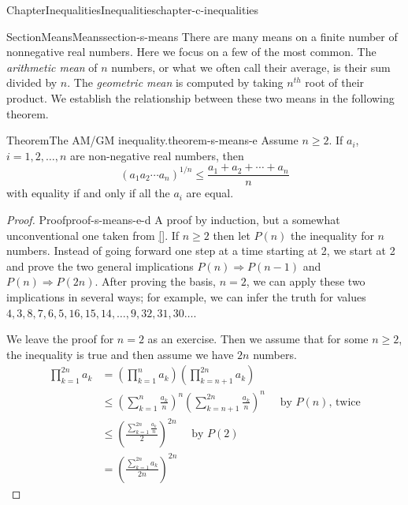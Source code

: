 \documentclass[oneside,10pt,]{book}
\newcommand{\xreffont}{\relax}
\numberwithin{equation}{section}
\begin{document}
\begin{chapterptx}{Chapter}{Inequalities}{}{Inequalities}{}{}{chapter-c-inequalities}
\typeout{************************************************}
%
\begin{sectionptx}{Section}{Means}{}{Means}{}{}{section-s-means}
%
%
There are many means on a finite number of nonnegative real numbers.  Here we focus on a few of the most common.  The \emph{arithmetic mean} of \(n\) numbers, or what we often call their average, is their sum divided by \(n\).  The \emph{geometric mean} is computed by taking \(n^{th}\) root of their product.  We establish the relationship between these two means in the following theorem.%
\begin{theorem}{Theorem}{The AM\slash{}GM inequality.}{}{theorem-s-means-e}%
%
Assume \(n \geq 2\).  If \(a_i\), \(i = 1, 2, \dots, n\) are non-negative real numbers, then%
\begin{equation*}
\left(a_1 a_2\cdots  a_n\right)^{1/n}\leq  \frac{a_1+a_2+\cdots +a_n}{n}
\end{equation*}
with equality if and only if all the \(a_i\) are equal.%
\end{theorem}
\begin{proof}{Proof}{}{proof-s-means-e-d}
A proof by induction, but a somewhat unconventional one taken from \hyperlink{biblio-biblio-aigner}{[{\xreffont 1}]}. If \(n \ge 2\) then let \(P(n)\) the inequality for \(n\) numbers.  Instead of going forward one step at a time starting at 2, we start at 2 and prove the two general implications  \(P(n)\Rightarrow P(n-1)\)  and \(P(n)\Rightarrow P(2n)\).  After proving the basis, \(n=2\), we can apply these two implications in several ways; for example, we can infer the truth for values \(4, 3, 8, 7, 6, 5, 16, 15, 14, \dots, 9, 32, 31, 30 \dots\).%
\par
We leave the proof for \(n=2\) as an exercise.  Then we assume that for some \(n \geq 2\), the inequality is true and then assume we have \(2n\) numbers.%
\begin{equation*}
\begin{split}
\prod_{k=1}^{2n} a_k &=\left(\prod_{k=1}^{n} a_k \right)\left(\prod_{k=n+1}^{2n} a_k  \right) \\	
& \leq \left(\sum_{k=1}^{n} \frac{a_k}{n} \right)^n \left(\sum_{k=n+1}^{2n} \frac{a_k}{n} \right)^n \quad \textrm{ by }P(n)\textrm{, twice}\\
& \leq \left(\frac{\sum_{k=1}^{2n} \frac{a_k}{n}}{2}\right)^{2n} \quad \textrm{ by }P(2)\\
& = \left(\frac{\sum_{k=1}^{2n} a_k}{2n}\right)^{2n} 

\end{split}
\end{equation*}
\end{proof}
\end{sectionptx}
\end{chapterptx}
\end{document}
